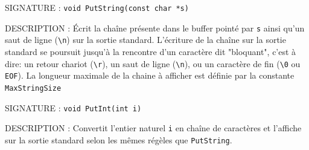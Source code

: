 \documentclass{article}
\begin{document}
		\vspace{3mm}
		\begin{description}
			\item{SIGNATURE : } \texttt{void PutString(const char *s)}
			\item{DESCRIPTION : } Écrit la chaîne présente dans le buffer pointé par \texttt{s} ainsi qu'un saut de ligne (\texttt{\textbackslash{}n}) sur la sortie standard. L'écriture de la chaîne sur la sortie standard se poursuit jusqu'à la rencontre d'un caractère dit "bloquant", c'est à dire: un retour chariot (\texttt{\textbackslash{}r}), un saut de ligne (\texttt{\textbackslash{}n}), ou un caractère de fin (\texttt{\textbackslash{}0} ou \texttt{EOF}). La longueur maximale de la chaine à afficher est définie par la constante \texttt{MaxStringSize}
		\end{description}
		\vspace{2.5mm}
		\begin{description}
			\item{SIGNATURE : } \texttt{void PutInt(int i)}
			\item{DESCRIPTION : } Convertit l'entier naturel \texttt{i} en chaîne de caractères et l'affiche sur la sortie standard selon les mêmes régèles que \texttt{PutString}.
		\end{description}
\end{document}
